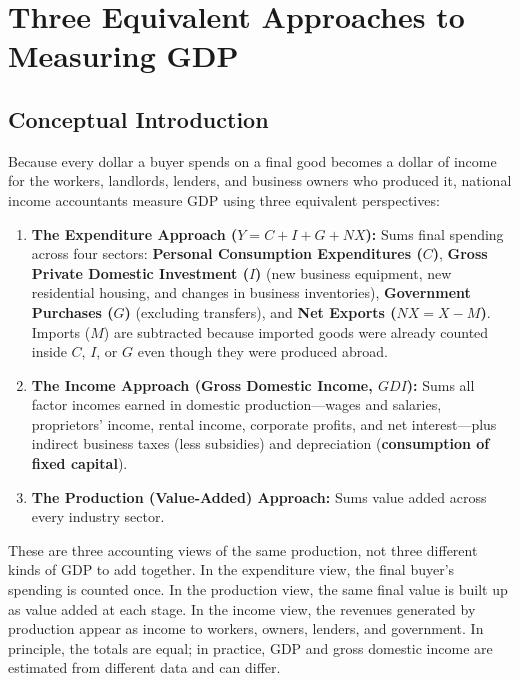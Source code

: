 \documentclass[11pt,letterpaper]{article}
\begin{document}
\section{Three Equivalent Approaches to Measuring GDP}

\subsection*{Conceptual Introduction}
Because every dollar a buyer spends on a final good becomes a dollar of income for the workers, landlords, lenders, and business owners who produced it, national income accountants measure GDP using three equivalent perspectives:
\begin{enumerate}
    \item \textbf{The Expenditure Approach ($Y = C + I + G + NX$):} Sums final spending across four sectors: \textbf{Personal Consumption Expenditures ($C$)}, \textbf{Gross Private Domestic Investment ($I$)} (new business equipment, new residential housing, and changes in business inventories), \textbf{Government Purchases ($G$)} (excluding transfers), and \textbf{Net Exports ($NX = X - M$)}. Imports ($M$) are subtracted because imported goods were already counted inside $C$, $I$, or $G$ even though they were produced abroad.
    \item \textbf{The Income Approach (Gross Domestic Income, $GDI$):} Sums all factor incomes earned in domestic production—wages and salaries, proprietors' income, rental income, corporate profits, and net interest—plus indirect business taxes (less subsidies) and depreciation (\textbf{consumption of fixed capital}).
    \item \textbf{The Production (Value-Added) Approach:} Sums value added across every industry sector.
\end{enumerate}

These are three accounting views of the same production, not three different kinds of GDP to add together. In the expenditure view, the final buyer's spending is counted once. In the production view, the same final value is built up as value added at each stage. In the income view, the revenues generated by production appear as income to workers, owners, lenders, and government. In principle, the totals are equal; in practice, GDP and gross domestic income are estimated from different data and can differ.
\end{document}
